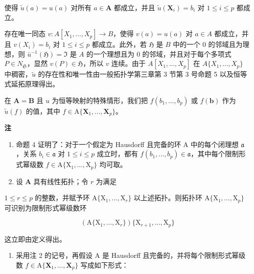 使得 \(\tilde{u}(a) = u(a)\) 对所有 \(a \in \mathbf{A}\) 都成立，并且 \(\tilde{u}(\mathbf{X}_i) = b_i\) 对 \(1 \leqslant i \leqslant p\) 都成立。

存在唯一同态 \(v \colon A[X_1, \ldots, X_p] \to B\)，使得 \(v(a) = u(a)\) 对 \(a \in A\) 都成立，并且 \(v(X_i) = b_i\) 对 \(1 \leqslant i \leqslant p\) 都成立。此外，若 \(\mathfrak{H}\) 是 \(B\) 中的一个 0 的邻域且为理想，则 \(\bar{u}^{-1}(\mathfrak{H}) = \mathfrak{I}\) 是 \(A\) 的一个理想且为 0 的邻域，并且对于每个多项式 \(P \in N_{\mathfrak{S}}\)，显然 \(v(P) \in \mathfrak{H}\)，所以 \(v\) 连续。由于 \(A[X_1, \ldots, X_p]\) 在 \(A\{X_1, \ldots, X_p\}\) 中稠密，\(\tilde{u}\) 的存在性和唯一性由一般拓扑学第三章第 3 节第 3 号命题 5 以及恒等式延拓原理得出。

在 \(\mathbf{A} = \mathbf{B}\) 且 \(u\) 为恒等映射的特殊情形，我们把 \(f(b_{1},\ldots ,b_{p})\) 或 \(f(\mathbf{b})\) 作为 \(\tilde{u} (f)\) 的值，其中 \(f\in \mathrm{A}\{\mathbf{X}_1,\dots ,\mathbf{X}_p\}\)。

\textbf{注}\par

\begin{enumerate}
\def\labelenumi{(\arabic{enumi})}
\item
  命题 4 证明了：对于一个假定为 Hausdorff 且完备的环 A 中的每个闭理想 \(\mathfrak{a}\)，关系 \(b_{i} \in \mathfrak{a}\) 对 \(1 \leqslant i \leqslant p\) 成立时，都有 \(f(b_{1}, \ldots, b_{p}) \in \mathfrak{a}\)，其中每个限制形式幂级数 \(f \in \mathrm{A}\{\mathrm{X}_{1}, \ldots, \mathrm{X}_{p}\}\) 均可取。
\item
  设 \(\mathbf{A}\) 具有线性拓扑；令 \(r\) 为满足
\end{enumerate}

\(1 \leqslant r \leqslant p\) 的整数，并赋予环 \(\mathrm{A}\{\mathrm{X}_1, \ldots, \mathrm{X}_r\}\) 以上述拓扑。则拓扑环 \(\mathrm{A}\{\mathrm{X}_1, \ldots, \mathrm{X}_p\}\) 可识别为限制形式幂级数环

\[
(\mathrm{A} \{\mathrm{X} _ {1}, \dots , \mathrm{X} _ {r} \}) \{\mathrm{X} _ {r + 1}, \dots , \mathrm{X} _ {p} \}
\]

这立即由定义得出。

\begin{enumerate}
\def\labelenumi{(\arabic{enumi})}
\setcounter{enumi}{2}
\tightlist
\item
  采用注 2 的记号，再假设 A 是 Hausdorff 且完备的，并将每个限制形式幂级数 \(f \in \mathrm{A}\{\mathbf{X}_1, \ldots, \mathbf{X}_p\}\) 写成如下形式：
\end{enumerate}


